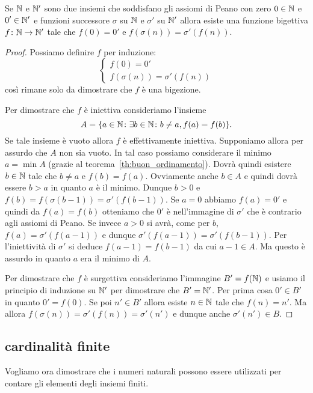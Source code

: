 \begin{theorem}
  \label{th:unicitaN}%
  Se ${\mathbb N}$ e ${\mathbb N}'$ sono due insiemi che soddisfano gli assiomi di Peano 
  con zero $0\in {\mathbb N}$ e $0'\in {\mathbb N}'$ e funzioni 
  successore $\sigma$ su ${\mathbb N}$ e $\sigma'$ su ${\mathbb N}'$ allora
  esiste una funzione bigettiva $f\colon {\mathbb N}\to {\mathbb N}'$ tale che 
  $f(0) = 0'$ e $f(\sigma(n)) = \sigma'(f(n))$.
\end{theorem}
%
\begin{proof}
Possiamo definire $f$ per induzione:
\[
\begin{cases}
  f(0) = 0' \\ 
  f(\sigma(n)) = \sigma'(f(n))
\end{cases}  
\]
così rimane solo da dimostrare che $f$ è una bigezione.

Per dimostrare che $f$ è iniettiva consideriamo l'insieme 
\[
  A={\left\{ a\in {\mathbb N}\colon \exists b\in {\mathbb N}\colon b\neq a, f(a)=f(b) \right\}}.
\]
Se tale insieme è vuoto allora $f$ è effettivamente iniettiva.
Supponiamo allora per assurdo che $A$ non sia vuoto.
In tal caso possiamo considerare il minimo $a=\min A$ 
(grazie al teorema~\ref{th:buon_ordinamento}).
Dovrà quindi esistere $b\in {\mathbb N}$ tale che $b\neq a$ e $f(b)=f(a)$.
Ovviamente anche $b\in A$ e quindi dovrà essere $b>a$ in quanto
$a$ è il minimo. Dunque $b>0$ e $f(b) = f(\sigma(b-1))
=\sigma'(f(b-1))$. Se $a=0$ abbiamo $f(a)=0'$ e quindi da $f(a)=f(b)$ 
otteniamo che $0'$ è nell'immagine di $\sigma'$ che è contrario 
agli assiomi di Peano. 
Se invece $a>0$ si avrà, come per $b$,
$f(a)=\sigma'(f(a-1))$ e dunque $\sigma'(f(a-1)) = \sigma'(f(b-1))$.
Per l'iniettività di $\sigma'$ si deduce $f(a-1)=f(b-1)$ da cui 
$a-1 \in A$. Ma questo è assurdo in quanto $a$ era il minimo di $A$.

Per dimostrare che $f$ è surgettiva consideriamo l'immagine 
$B'=f({\mathbb N})$ e usiamo il principio di induzione su ${\mathbb N}'$ 
per dimostrare che $B'={\mathbb N}'$.
Per prima cosa $0'\in B'$ in quanto $0'=f(0)$.
Se poi $n'\in B'$ allora esiste $n\in {\mathbb N}$ tale che $f(n)=n'$.
Ma allora $f(\sigma(n))=\sigma'(f(n))=\sigma'(n')$ 
e dunque anche $\sigma'(n')\in B$. 
\end{proof}

\subsection{cardinalità finite}

Vogliamo ora dimostrare che i numeri naturali possono essere utilizzati 
per contare gli elementi degli insiemi finiti.

